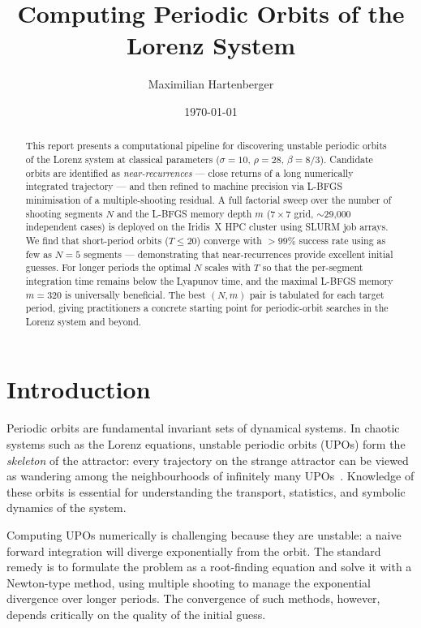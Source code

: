 \documentclass[11pt,a4paper]{article}
\title{\textbf{Computing Periodic Orbits of the Lorenz System}\\[4pt]}
\author{Maximilian Hartenberger\\[2pt]}
\date{\today}
\begin{document}
\maketitle

\begin{abstract}
This report presents a computational pipeline for discovering unstable
periodic orbits of the Lorenz system at classical parameters
($\sigma=10$, $\rho=28$, $\beta=8/3$).  Candidate orbits are identified
as \emph{near-recurrences} --- close returns of a long numerically
integrated trajectory --- and then refined to machine precision via
L-BFGS minimisation of a multiple-shooting residual.  A full factorial
sweep over the number of shooting segments $N$ and the L-BFGS memory
depth $m$ ($7\times7$ grid, $\sim$29,000 independent cases) is deployed
on the Iridis~X HPC cluster using SLURM job arrays.  We find that
short-period orbits ($T \le 20$) converge with $>\!99\%$ success rate
using as few as $N=5$ segments --- demonstrating that near-recurrences
provide excellent initial guesses.  For longer periods the optimal $N$
scales with $T$ so that the per-segment integration time remains below
the Lyapunov time, and the maximal L-BFGS memory $m=320$ is
universally beneficial.  The best $(N,m)$ pair is tabulated for each
target period, giving practitioners a concrete starting point for
periodic-orbit searches in the Lorenz system and beyond.
\end{abstract}

\section{Introduction}

Periodic orbits are fundamental invariant sets of dynamical systems.  In
chaotic systems such as the Lorenz equations, unstable periodic orbits (UPOs)
form the \emph{skeleton} of the attractor: every trajectory on the strange
attractor can be viewed as wandering among the neighbourhoods of infinitely
many UPOs~\cite{cvitanovic2016chaos}.  Knowledge of these orbits is essential
for understanding the transport, statistics, and symbolic dynamics of the
system.

Computing UPOs numerically is challenging because they are unstable: a naive
forward integration will diverge exponentially from the orbit.  The standard
remedy is to formulate the problem as a root-finding equation and solve it
with a Newton-type method, using multiple shooting to manage the exponential
divergence over longer periods.  The convergence of such methods, however,
depends critically on the quality of the initial guess.
\end{document}
